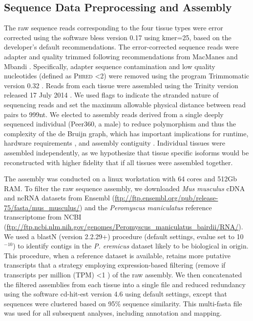 \documentclass[12pt]{article}
\begin{document}
\subsection*{Sequence Data Preprocessing and Assembly}

The raw sequence reads corresponding to the four tissue types were error corrected using the software bless version 0.17 \citep{Heo:2014cb} using kmer=25, based on the developer's default recommendations. The error-corrected sequence reads were adapter and quality trimmed following recommendations from MacManes \citep{MacManes:2014io} and Mbandi \citep{Christoffels:2014bg}. Specifically, adapter sequence contamination and low quality nucleotides (defined as \textsc{Phred} \textless 2) were removed using the program Trimmomatic version 0.32  \citep{Lohse:2012fg}. Reads from each tissue were assembled using the Trinity version released 17 July 2014 \citep{Haas:2013jq}. We used flags to indicate the stranded nature of sequencing reads and set the maximum allowable physical distance between read pairs to 999nt. We elected to assembly reads derived from a single deeply sequenced individual (Peer360, a male) to reduce polymorphism and thus the complexity of the de Bruijn graph, which has important implications for runtime, hardware requirements \citep{Lowe:2014iv,Pop:2009dp}, and assembly contiguity \citep{Vijay:2012gy and MacManes unpublished observations}. Individual tissues were assembled independently, as we hypothesize that tissue specific isoforms would be reconstructed with higher fidelity that if all tissues were assembled together. 


The assembly was conducted on a linux workstation with 64 cores and 512Gb RAM. To filter the raw sequence assembly, we downloaded \textit{Mus musculus} cDNA and ncRNA datasets from Ensembl (\url{ftp://ftp.ensembl.org/pub/release-75/fasta/mus_musculus/}) and the \textit{Peromyscus maniculatus} reference transcriptome from NCBI (\url{ftp://ftp.ncbi.nlm.nih.gov/genomes/Peromyscus_maniculatus_bairdii/RNA/}). We used a blastN (version 2.2.29+) procedure (default settings, evalue set to 10$^{-10}$) to identify contigs in the \textit{P. eremicus} dataset likely to be biological in origin. This procedure, when a reference dataset is available, retains more putative transcripts that a strategy employing expression-based filtering (remove if transcripts per million (TPM) \textless 1  \citep{MacManes:2012bu}) of the raw assembly. We then concatenated the filtered assemblies from each tissue into a single file and reduced redundancy using the software cd-hit-est version 4.6 \citep{Li:2006hr} using default settings, except that sequences were clustered based on 95\% sequence similarity. This multi-fasta file was used for all subsequent analyses, including annotation and mapping. \\
\end{document}
